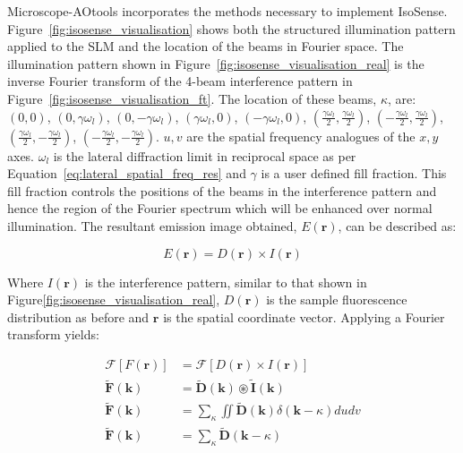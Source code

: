 Microscope-AOtools incorporates the methods necessary to implement
IsoSense. Figure~\ref{fig:isosense_visualisation} shows both
the structured illumination pattern applied to the SLM 
and the location of the beams in Fourier space. The illumination
pattern shown in Figure~\ref{fig:isosense_visualisation_real} is
the inverse Fourier transform of the 4-beam interference pattern 
in Figure~\ref{fig:isosense_visualisation_ft}. The location 
of these beams, $\kappa$, are: 
$(0,0)$, $(0,\gamma \omega_{l})$, $(0,-\gamma \omega_{l})$, 
$(\gamma \omega_{l}, 0)$, $(-\gamma \omega_{l}, 0)$, 
$(\frac{\gamma \omega_{l}}{2}, \frac{\gamma \omega_{l}}{2})$, 
$(-\frac{\gamma \omega_{l}}{2}, \frac{\gamma \omega_{l}}{2})$, 
$(\frac{\gamma \omega_{l}}{2}, -\frac{\gamma \omega_{l}}{2})$, 
$(-\frac{\gamma \omega_{l}}{2}, -\frac{\gamma \omega_{l}}{2})$. 
$u,v$ are the spatial frequency analogues of the $x,y$ axes. 
$\omega_{l}$ is the lateral diffraction limit in reciprocal space 
as per Equation~\ref{eq:lateral_spatial_freq_res} and $\gamma$ is 
a user defined fill fraction. This fill fraction controls the 
positions of the beams in the interference pattern and hence the 
region of the Fourier spectrum which will be enhanced over normal 
illumination. The resultant emission image  obtained, $E(\textbf{r})$, 
can be described as:

\begin{equation}\label{eq:isosense_real}
E(\textbf{r}) = D(\textbf{r}) \times I(\textbf{r})
\end{equation}	

Where $I(\textbf{r})$ is the interference pattern, similar to that shown in 
Figure\ref{fig:isosense_visualisation_real}, $D(\textbf{r})$ is the sample 
fluorescence distribution as before and $\textbf{r}$ is the spatial 
coordinate vector. Applying a Fourier transform yields:

\begin{equation}\label{eq:isosense_ft}
\begin{split}
\mathcal{F}[F(\textbf{r})] &= \mathcal{F}[D(\textbf{r})\times I(\textbf{r})] \\
\tilde{\textbf{F}}(\textbf{k}) &= \tilde{\textbf{D}}(\textbf{k}) \circledast \tilde{\textbf{I}}(\textbf{k}) \\
\tilde{\textbf{F}}(\textbf{k}) &= \sum_{\kappa}\iint\tilde{\textbf{D}}(\textbf{k})\delta(\textbf{k} - \kappa)dudv \\
\tilde{\textbf{F}}(\textbf{k}) &= \sum_{\kappa}\tilde{\textbf{D}}(\textbf{k} - \kappa)
\end{split}
\end{equation}


